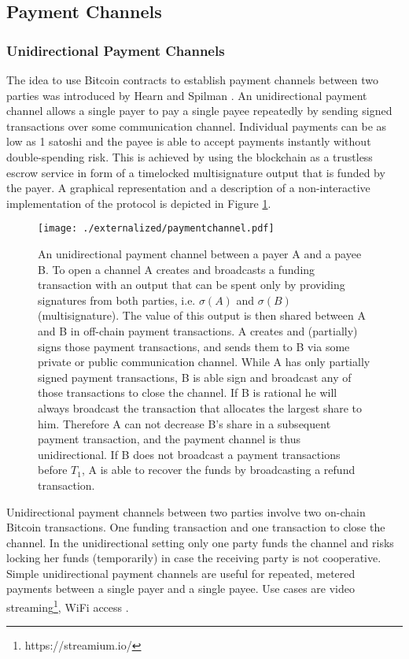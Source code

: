 \subsection{Payment Channels}

\subsubsection{Unidirectional Payment Channels}
\label{sec:unipc}

The idea to use Bitcoin contracts to establish payment channels between two parties was introduced by Hearn and Spilman \cite{Hearn}. An unidirectional payment channel allows a single payer to pay a single payee repeatedly by sending signed transactions over some communication channel. Individual payments can be as low as 1 satoshi and the payee is able to accept payments instantly without double-spending risk. This is achieved by using the blockchain as a trustless escrow service in form of a timelocked multisignature output that is funded by the payer. A graphical representation and a description of a non-interactive implementation of the protocol is depicted in Figure \ref{fig:paymentchannels}.

\begin{figure}
\texttt{[image: ./externalized/paymentchannel.pdf]}
\caption{An unidirectional payment channel between a payer A and a payee B. To open a channel A creates and broadcasts a funding transaction with an output that can be spent only by providing signatures from both parties, i.e. $\sigma(A)$ and $\sigma(B)$ (multisignature). The value of this output is then shared between A and B in off-chain payment transactions. A creates and (partially) signs those payment transactions, and sends them to B via some private or public communication channel. While A has only partially signed payment transactions, B is able sign and broadcast any of those transactions to close the channel. If B is rational he will always broadcast the transaction that allocates the largest share to him. Therefore A can not decrease B's share in a subsequent payment transaction, and the payment channel is thus unidirectional. If B does not broadcast a payment transactions before $T_1$, A is able to recover the funds by broadcasting a refund transaction.}
\label{fig:paymentchannels}
\end{figure}

Unidirectional payment channels between two parties involve two on-chain Bitcoin transactions. One funding transaction and one transaction to close the channel. In the unidirectional setting only one party funds the channel and risks locking her funds (temporarily) in case the receiving party is not cooperative. Simple unidirectional payment channels are useful for repeated, metered payments between a single payer and a single payee. Use cases are video streaming\footnote{https://streamium.io/}, WiFi access \cite{Siby2013}.

